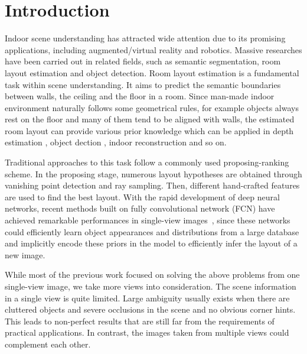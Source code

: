 \section{Introduction}

Indoor scene understanding has attracted wide attention due to its promising applications, including augmented/virtual reality and robotics. Massive researches have been carried out in related fields, such as semantic segmentation, room layout estimation and object detection. 
Room layout estimation is a fundamental task within scene understanding. It aims to predict the semantic boundaries between walls, the ceiling and the floor in a room. 
Since man-made indoor environment naturally follows some geometrical rules, for example objects always rest on the floor and many of them tend to be aligned with walls, the estimated room layout can provide various prior knowledge which can be applied in depth estimation \cite{depth}, object dection \cite{bibid}, indoor reconstruction \cite{2017iccvjoint} and so on.

Traditional approaches to this task follow a commonly used proposing-ranking scheme. In the proposing stage, numerous layout hypotheses are obtained through vanishing point detection and ray sampling. Then, different hand-crafted features are used to find the best layout. 
With the rapid development of deep neural networks, recent methods built on fully convolutional network (FCN) have achieved remarkable performances in single-view images~\cite{PIO,CFILE,DELAY,ICIP2018}, since these networks could efficiently learn object appearances and distributions from a large database and implicitly encode these priors in the model to efficiently infer the layout of a new image. 


While most of the previous work focused on solving the above problems from one single-view image, we take more views into consideration. 
%
The scene information in a single view is quite limited. 
Large ambiguity usually exists when there are cluttered objects and severe occlusions in the scene and no obvious corner hints.  
This leads to non-perfect results that are still far from the requirements of practical applications. 
%
In contrast, the images taken from multiple views could complement each other. 

